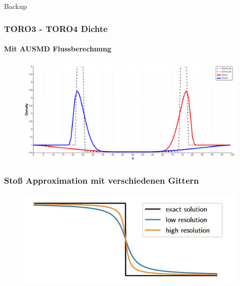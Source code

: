 \documentclass[
	11pt, %
	aspectratio=169, %
]{beamer}
\begin{document}
\begin{frame}[plain] %
	\begin{center}
   
   \bigskip\bigskip %
   
   {\LARGE Backup}
\end{center}
\end{frame}

\begin{frame}
	\frametitle{TORO3 - TORO4 Dichte}
	\framesubtitle{ Mit AUSMD Flussberechnung}
	\begin{figure}
		\includegraphics[width=0.9\linewidth]{Toro3Toro4_density.png}
	\end{figure}
	

\end{frame}

\begin{frame}
	\frametitle{Stoß Approximation mit verschiedenen Gittern}
	\begin{figure}
		\includegraphics[width=0.5\linewidth]{stoss.jpg}
	\end{figure}
	

\end{frame}
\end{document}
